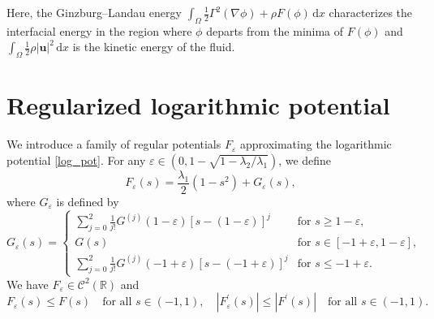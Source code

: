 \documentclass[11pt]{article}
\def\bfu{\mathbf{u}}
\def\md{\mathrm{d}}
\begin{document}
Here, the Ginzburg–Landau energy $\int_{\Omega} \frac{1}{2}\Gamma^2(\nabla\phi) + \rho F(\phi)\,\md x $ characterizes the interfacial energy in the region where $\phi$ departs from the minima of $F(\phi)$ and $\int_{\Omega} \frac{1}{2}\rho |\bfu|^2\,\md x$ is the kinetic energy of the fluid.

\section{Regularized logarithmic potential}\label{Reg_log}

We introduce a family of regular potentials $F_{\varepsilon}$ approximating the logarithmic potential \eqref{log_pot}. For any $\varepsilon \in (0,1 - \sqrt{1 - {\lambda_2}/{\lambda_1}})$, we define
\begin{equation}
F_{\varepsilon}(s) = \frac{\lambda_1}{2}(1 - s^2) + G_{\varepsilon}(s),
\end{equation}
where $G_{\varepsilon}$ is defined by
\begin{equation}
G_{\varepsilon}(s)= 
\begin{cases} 
\sum_{j=0}^2 \frac{1}{j!} G^{(j)}(1-\varepsilon)[s-(1-\varepsilon)]^j & \text{for } s \geq 1-\varepsilon, \\ 
G(s) & \text{for } s \in [-1+\varepsilon, 1-\varepsilon], \\ 
\sum_{j=0}^2 \frac{1}{j!} G^{(j)}(-1+\varepsilon)[s-(-1+\varepsilon)]^j & \text{for } s \leq -1+\varepsilon.
\end{cases}
\end{equation}
We have $F_{\varepsilon} \in \mathcal{C}^2(\mathbb{R})$ and 
\begin{equation}
F_{\varepsilon}(s) \leq F(s) \quad \text{for all } s \in (-1,1), \quad
|F_{\varepsilon}^{\prime}(s)| \leq |F^{\prime}(s)| \quad \text{for all } s \in (-1,1). \label{F_propriety}
\end{equation}
\end{document}

